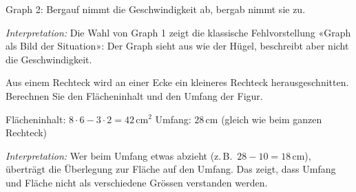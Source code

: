 \documentclass[11pt]{exam}
\newcommand{\aufgabe}[1]{%
  \needspace{8\baselineskip}%
  \renewcommand{\questionlabel}{\textbf{#1}}%
  \question}
\newcommand{\raum}[1]{\ifprintanswers\else\fillwithgrid{#1}\fi}
\newcommand{\wahl}[1]{\mbox{$\Box$\,#1}}
\newcommand{\wahlr}[1]{\mbox{\ifprintanswers$\blacksquare$\,\textbf{#1}\else$\Box$\,#1\fi}}
\newcommand{\diagnose}[1]{\par\smallskip\textit{Interpretation:} #1}
\begin{document}
\begin{questions}
\begin{center}
\newcommand{\achsen}{%
  \draw[->] (0,0) -- (2.4,0) node[below] {\scriptsize $t$};
  \draw[->] (0,0) -- (0,1.7) node[left]  {\scriptsize $v$};}
\end{center}
\begin{solution}
  Graph 2: Bergauf nimmt die Geschwindigkeit ab, bergab nimmt sie zu.
  \diagnose{Die Wahl von Graph 1 zeigt die klassische Fehlvorstellung «Graph
  als Bild der Situation»: Der Graph sieht aus wie der Hügel, beschreibt aber
  nicht die Geschwindigkeit.}
\end{solution}

\aufgabe{8.3}
Aus einem Rechteck wird an einer Ecke ein kleineres Rechteck herausgeschnitten.
Berechnen Sie den Flächeninhalt und den Umfang der Figur.

\begin{center}
\end{center}
\begin{solution}
  Flächeninhalt: $8 \cdot 6 - 3 \cdot 2 = 42$\,cm$^2$ \qquad
  Umfang: $28$\,cm (gleich wie beim ganzen Rechteck)
  \diagnose{Wer beim Umfang etwas abzieht (z.\,B.\ $28 - 10 = 18$\,cm),
  überträgt die Überlegung zur Fläche auf den Umfang. Das zeigt, dass Umfang
  und Fläche nicht als verschiedene Grössen verstanden werden.}
\end{solution}
\raum{3.5cm}


\end{questions}
\end{document}
